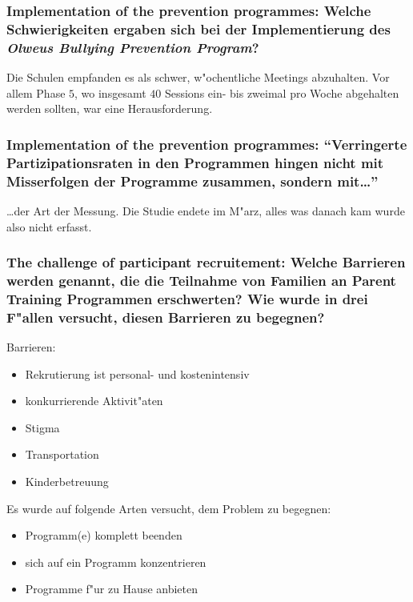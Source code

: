 \subsubsection{Implementation of the prevention programmes: Welche Schwierigkeiten ergaben sich bei der Implementierung des \emph{Olweus Bullying Prevention Program}?}
Die Schulen empfanden es als schwer, w"ochentliche Meetings abzuhalten. Vor allem Phase $5$, wo insgesamt $40$ Sessions ein- bis zweimal pro Woche abgehalten werden sollten, war eine Herausforderung.

\subsubsection{Implementation of the prevention programmes: ``Verringerte Partizipationsraten in den Programmen hingen nicht mit Misserfolgen der Programme zusammen, sondern mit\ldots''}
\ldots der Art der Messung. Die Studie endete im M"arz, alles was danach kam wurde also nicht erfasst.

\subsubsection{The challenge of participant recruitement: Welche Barrieren werden genannt, die die Teilnahme von Familien an Parent Training Programmen erschwerten? Wie wurde in drei F"allen versucht, diesen Barrieren zu begegnen?}Barrieren:
\begin{itemize}
        \item Rekrutierung ist personal- und kostenintensiv
        \item konkurrierende Aktivit"aten
        \item Stigma
        \item Transportation
        \item Kinderbetreuung
\end{itemize}

\noindent Es wurde auf folgende Arten versucht, dem Problem zu begegnen:
\begin{itemize}
        \item Programm(e) komplett beenden
        \item sich auf ein Programm konzentrieren
        \item Programme f"ur zu Hause anbieten
\end{itemize}



